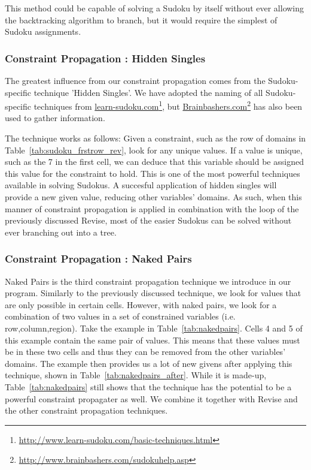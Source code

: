 \documentclass[11pt]{article} %
\begin{document}
This method could be capable of solving a Sudoku by itself without ever allowing the backtracking algorithm to branch, but it would require the simplest of Sudoku assignments.

\subsubsection{Constraint Propagation : Hidden Singles}
\label{sec:hsingles}
The greatest influence from our constraint propagation comes from the Sudoku-specific technique 'Hidden Singles'. We have adopted the naming of all Sudoku-specific techniques from \url{learn-sudoku.com}\footnote{\url{http://www.learn-sudoku.com/basic-techniques.html}}, but \url{Brainbashers.com}\footnote{\url{http://www.brainbashers.com/sudokuhelp.asp}} has also been used to gather information.

The technique works as follows: Given a constraint, such as the row of domains in Table~\ref{tab:sudoku_frstrow_rev}, look for any unique values. If a value is unique, such as the 7 in the first cell, we can deduce that this variable should be assigned this value for the constraint to hold.
This is one of the most powerful techniques available in solving Sudokus. A succesful application of hidden singles will provide a new given value, reducing other variables' domains. As such, when this manner of constraint propagation is applied in combination with the loop of the previously discussed Revise, most of the easier Sudokus can be solved without ever branching out into a tree.

\subsubsection{Constraint Propagation : Naked Pairs}
\label{sec:npairs}
Naked Pairs is the third constraint propagation technique we introduce in our program. Similarly to the previously discussed technique, we look for values that are only possible in certain cells. However, with naked pairs, we look for a combination of two values in a set of constrained variables (i.e. row,column,region).
Take the example in Table~\ref{tab:nakedpairs}. Cells 4 and 5 of this example contain the same pair of values. This means that these values must be in these two cells and thus they can be removed from the other variables' domains. The example then provides us a lot of new givens after applying this technique, shown in Table~\ref{tab:nakedpairs_after}.
While it is made-up, Table~\ref{tab:nakedpairs} still shows that the technique has the potential to be a powerful constraint propagater as well. We combine it together with Revise and the other constraint propagation techniques.
\end{document}
